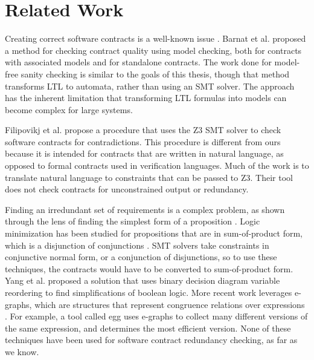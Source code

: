 \documentclass{article}
\newif\ifcomments
\newcommand{\cass}[1]{\ifcomments\textcolor{blue}{cass: #1}\fi}
\begin{document}
\section{Related Work}

Creating correct software contracts is a well-known issue \cite{rozier2016specification} \cite{kupferman2006sanity}.
Barnat et al. \cite{barnat2012checking} \cite{barnat2016analysing} proposed a method for checking contract quality using model checking,
both for contracts with associated models and for standalone contracts. The work done for model-free sanity checking is
similar to the goals of this thesis, though that method transforms LTL to automata, rather than using an SMT solver. The approach
has the inherent limitation that transforming LTL formulas into models can become complex for large systems.

Filipovikj et al. \cite{filipovikj2017smt} propose a procedure that uses the Z3 SMT solver \cite{de2008z3} to check software contracts
for contradictions. This procedure is different from ours because it is intended for contracts that are written in
natural language, as opposed to formal contracts used in verification languages. Much of the work is to translate
natural language to constraints that can be passed to Z3. Their tool does not check contracts
for unconstrained output or redundancy. 

Finding an irredundant set of requirements is a complex problem, as shown through the lens of finding the simplest form 
of a proposition \cite{umans2006complexity}. Logic minimization has been studied for propositions that are in sum-of-product form, which is a 
disjunction of conjunctions \cite{coudert1994two}. SMT solvers take constraints in conjunctive normal form, or a conjunction of disjunctions, so to use these 
techniques, the contracts would have to be converted to sum-of-product form. Yang et al. \cite{yang2000bds} proposed a solution that uses binary 
decision diagram \cite{akers1978functional} variable reordering to 
find simplifications of boolean logic. More recent work leverages e-graphs, which are structures that represent congruence relations over expressions \cite{nelson1980fast}. For example, a tool called egg \cite{willsey2020egg} uses e-graphs to collect many different versions of the same expression, and determines the most efficient version. None of these techniques have been used for software contract redundancy checking, as far as we know. 
\cass{Added stuff about egg - it was interesting! Let me know if I misunderstood anything.}
\end{document}

